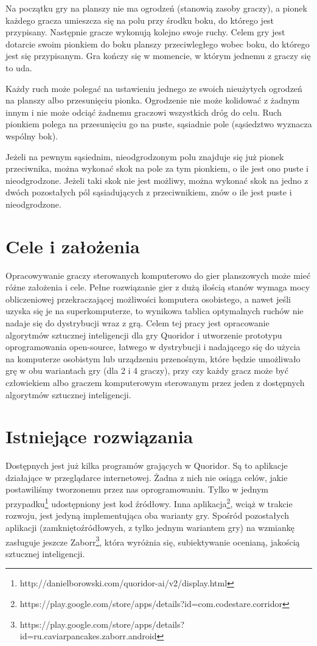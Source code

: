 \documentclass{pracamgr}
\begin{document}
Na początku gry na planszy nie ma ogrodzeń (stanowią zasoby graczy), a pionek każdego gracza umieszcza się na polu przy środku boku, do którego jest przypisany.
Następnie gracze wykonują kolejno swoje ruchy. Celem gry jest dotarcie swoim pionkiem do boku planszy przeciwległego wobec boku, do którego jest się przypisanym. Gra kończy się w momencie, w którym jednemu z graczy się to uda.

Każdy ruch może polegać na ustawieniu jednego ze swoich nieużytych ogrodzeń na planszy albo przesunięciu pionka. Ogrodzenie nie może kolidować z żadnym innym i nie może odciąć żadnemu graczowi wszystkich dróg do celu. Ruch pionkiem polega na przesunięciu go na puste, sąsiadnie pole (sąsiedztwo wyznacza wspólny bok).

Jeżeli na pewnym sąsiednim, nieodgrodzonym polu znajduje się już pionek przeciwnika, można wykonać skok na pole za tym pionkiem, o ile jest ono puste i nieodgrodzone. Jeżeli taki skok nie jest możliwy, można wykonać skok na jedno z dwóch pozostałych pól sąsiadujących z przeciwnikiem, znów o ile jest puste i nieodgrodzone.

\section{Cele i założenia}

Opracowywanie graczy sterowanych komputerowo do gier planszowych może mieć różne założenia i cele. Pełne rozwiązanie gier z dużą ilością stanów wymaga mocy obliczeniowej przekraczającej możliwości komputera osobistego, a nawet jeśli uzyska się je na superkomputerze, to wynikowa tablica optymalnych ruchów nie nadaje się do dystrybucji wraz z grą. Celem tej pracy jest opracowanie algorytmów sztucznej inteligencji dla gry Quoridor i utworzenie prototypu oprogramowania open-source, łatwego w dystrybucji i nadającego się do użycia na komputerze osobistym lub urządzeniu przenośnym, które będzie umożliwało grę w obu wariantach gry (dla 2 i 4 graczy), przy czy każdy gracz może być człowiekiem albo graczem komputerowym sterowanym przez jeden z dostępnych algorytmów sztucznej inteligencji.

\section{Istniejące rozwiązania}

Dostępnych jest już kilka programów grających w Quoridor. Są to aplikacje działające w przeglądarce internetowej. Żadna z nich nie osiąga celów, jakie postawiliśmy tworzonemu przez nas oprogramowaniu.
Tylko w jednym przypadku\footnote{http://danielborowski.com/quoridor-ai/v2/display.html} udostępniony jest kod źródłowy.
Inna aplikacja\footnote{https://play.google.com/store/apps/details?id=com.codestare.corridor}, wciąż w trakcie rozwoju, jest jedyną implementująca oba warianty gry.
Spośród pozostałych aplikacji (zamkniętoźródłowych, z tylko jednym wariantem gry) na wzmiankę zasługuje jeszcze Zaborr\footnote{https://play.google.com/store/apps/details?id=ru.caviarpancakes.zaborr.android}, która wyróżnia się, subiektywanie ocenianą, jakością sztucznej inteligencji.
\end{document}
